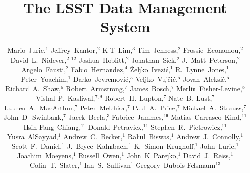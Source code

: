 \documentclass[11pt,twoside]{article}
\begin{document}
\title{The LSST Data Management System}
\author{
Mario~Juric,$^1$
Jeffrey~Kantor,$^2$
K-T~Lim,$^3$
Tim~Jenness,$^2$
Frossie~Economou,$^2$
David~L.~Nidever,$^{2,12}$
Joshua~Hoblitt,$^2$
Jonathan~Sick,$^2$
J.~Matt~Peterson,$^2$
Angelo~Fausti,$^2$
Fabio~Hernandez,$^4$
\v{Z}eljko~Ivezi\'{c},$^1$
R.~Lynne~Jones,$^1$
Peter~Yoachim,$^1$
Darko~Jevremovi\'c,$^5$
Veljko~Vuj\v ci\'c,$^5$
Jovan~Aleksi\'c,$^5$
Richard~A.~Shaw,$^6$
Robert~Armstrong,$^7$
James~Bosch,$^7$
Merlin~Fisher-Levine,$^8$
Vishal~P.~Kasliwal,$^{7,9}$
Robert~H.~Lupton,$^7$
Nate~B.~Lust,$^7$
Lauren~A.~MacArthur,$^7$
Peter~Melchior,$^7$
Paul~A.~Price,$^7$
Michael~A.~Strauss,$^7$
John~D.~Swinbank,$^7$
Jacek~Becla,$^3$
Fabrice~Jammes,$^{10}$
Matias~Carrasco~Kind,$^{11}$
Hsin-Fang~Chiang,$^{11}$
Donald~Petravick,$^{11}$
Stephen~R.~Pietrowicz,$^{11}$
Yusra~AlSayyad,$^1$
Andrew~C.~Becker,$^1$
Rahul~Biswas,$^1$
Andrew~J.~Connolly,$^1$
Scott~F.~Daniel,$^1$
J.~Bryce~Kalmbach,$^1$
K.~Simon~Krughoff,$^1$
John~Lurie,$^1$
Joachim~Moeyens,$^1$
Russell~Owen,$^1$
John~K~Parejko,$^1$
David~J.~Reiss,$^1$
Colin~T.~Slater,$^1$
Ian~S.~Sullivan$^1$
Gregory~Dubois-Felsmann$^{13}$
}
\end{document}

